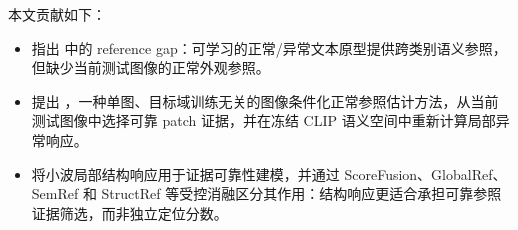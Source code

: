 本文贡献如下：
\begin{itemize}
  \item 指出 \clipzsad{} 中的 reference gap：可学习的正常/异常文本原型提供跨类别语义参照，但缺少当前测试图像的正常外观参照。
  \item 提出 \method{}，一种单图、目标域训练无关的图像条件化正常参照估计方法，从当前测试图像中选择可靠 patch 证据，并在冻结 CLIP 语义空间中重新计算局部异常响应。
  \item 将小波局部结构响应用于证据可靠性建模，并通过 ScoreFusion、GlobalRef、SemRef 和 StructRef 等受控消融区分其作用：结构响应更适合承担可靠参照证据筛选，而非独立定位分数。
\end{itemize}
